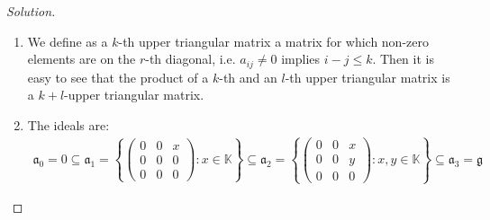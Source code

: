 \documentclass{report}
\begin{document}
\begin{proof}[Solution]
    \begin{enumerate}[label = (\roman*)]
        \item We define as a $k$-th upper triangular matrix a matrix for which non-zero elements are on the $r$-th diagonal, i.e. $a_{ij} \neq 0$ implies $i-j \leq k$.
        Then it is easy to see that the product of a $k$-th and an $l$-th upper triangular matrix is a $k+l$-upper triangular matrix.
        \item The ideals are:
        \begin{align*}
            \mathfrak a_0 = 0 \subseteq
            \mathfrak a_1 = \left\{
            \begin{pmatrix}
                0 & 0 & x\\
                0 & 0 & 0\\
                0 & 0 & 0
            \end{pmatrix} : x \in \mathbb K
            \right\} \subseteq
            \mathfrak a_2 = \left\{
            \begin{pmatrix}
                0 & 0 & x\\
                0 & 0 & y\\
                0 & 0 & 0
            \end{pmatrix} : x, y \in \mathbb K
            \right\} \subseteq \mathfrak a_3 = \mathfrak g
        \end{align*}
    \end{enumerate}
\end{proof}
\end{document}
